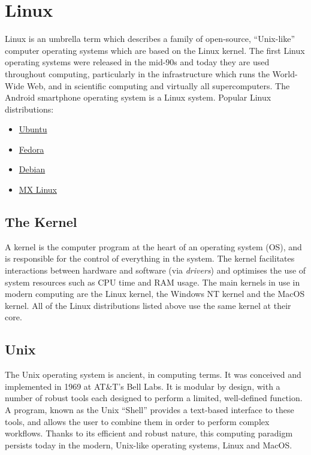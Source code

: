 \documentclass[
  english,
  paper=a4,
  ,captions=tableheading
]{scrartcl}
\providecommand{\tightlist}{%
  \setlength{\itemsep}{0pt}\setlength{\parskip}{0pt}}
\begin{document}
\hypertarget{linux}{%
\section{Linux}\label{linux}}

Linux is an umbrella term which describes a family of open-source,
\enquote{Unix-like} computer operating systems which are based on the
Linux kernel. The first Linux operating systems were released in the
mid-90s and today they are used throughout computing, particularly in
the infrastructure which runs the World-Wide Web, and in scientific
computing and virtually all supercomputers. The Android smartphone
operating system is a Linux system. Popular Linux distributions:

\begin{itemize}
\tightlist
\item
  \href{https://ubuntu.com/}{Ubuntu}
\item
  \href{https://getfedora.org/}{Fedora}
\item
  \href{https://www.debian.org/}{Debian}
\item
  \href{https://mxlinux.org/}{MX Linux}
\end{itemize}

\hypertarget{the-kernel}{%
\subsection{The Kernel}\label{the-kernel}}

A kernel is the computer program at the heart of an operating system
(OS), and is responsible for the control of everything in the system.
The kernel facilitates interactions between hardware and software (via
\emph{drivers}) and optimises the use of system resources such as CPU
time and RAM usage. The main kernels in use in modern computing are the
Linux kernel, the Windows NT kernel and the MacOS kernel. All of the
Linux distributions listed above use the same kernel at their core.

\hypertarget{unix}{%
\subsection{Unix}\label{unix}}

The Unix operating system is ancient, in computing terms. It was
conceived and implemented in 1969 at AT\&T's Bell Labs. It is modular by
design, with a number of robust tools each designed to perform a
limited, well-defined function. A program, known as the Unix
\enquote{Shell} provides a text-based interface to these tools, and
allows the user to combine them in order to perform complex workflows.
Thanks to its efficient and robust nature, this computing paradigm
persists today in the modern, Unix-like operating systems, Linux and
MacOS.
\end{document}
